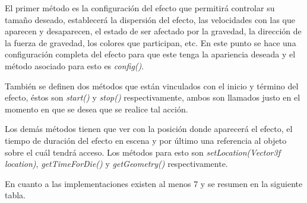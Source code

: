 \documentclass[a4paper,12pt,openany,oneside]{book}
\begin{document}
El primer método es la configuración del efecto que permitirá controlar su tamaño deseado, establecerá la dispersión del efecto, las velocidades con las que aparecen y desaparecen, el estado de ser afectado por la gravedad, la dirección de la fuerza de gravedad, los colores que participan, etc. En este punto se hace una configuración completa del efecto para que este tenga la apariencia deseada y el método asociado para esto es \textit{config()}.

También se definen dos métodos que están vinculados con el inicio y término del efecto, éstos son \textit{start()} y \textit{stop()} respectivamente, ambos son llamados justo en el momento en que se desea que se realice tal acción.

Los demás métodos tienen que ver con la posición donde aparecerá el efecto, el tiempo de duración del efecto en escena y por último una referencia al objeto sobre el cuál tendrá acceso. Los métodos para esto son \textit{setLocation(Vector3f location)}, \textit{getTimeForDie()} y \textit{getGeometry()} respectivamente.

En cuanto a las implementaciones existen al menos 7 y se resumen en la siguiente tabla.
\end{document}
